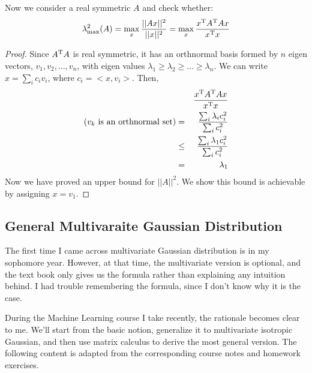 Now we consider a real symmetric $A$ and check whether:
\begin{equation}
	\lambda^2_{\max}(A) = \max_{x}{\frac{||Ax||^2}{||x||^2}}
	= \max_{x}{\frac{x^\mathrm{T}A^\mathrm{T}Ax}{x^\mathrm{T}x}}
\end{equation}

\begin{proof}
Since $A^\mathrm{T}A$ is real symmetric, it has an orthnormal basis 
formed by $n$ eigen vectors, $v_1, v_2, \dots, v_n$, with 
eigen values $\lambda_1 \ge \lambda_2 \ge \dots \ge \lambda_n$. We can 
write $x=\sum_{i}{c_iv_i}$, where $c_i=<x,v_i>$. Then, 
\begin{eqnarray}
	&&\frac{x^\mathrm{T}A^\mathrm{T}Ax}{x^\mathrm{T}x} \\
	\text{($v_k$ is an orthnormal set)}&=& \frac{\sum_i \lambda_i c_i^2}{\sum_{i}{c_i^2}} \\
	&\le & \frac{\sum_i \lambda_1 c_i^2}{\sum_{i}{c_i^2}} \\
	&=& \lambda_1
\end{eqnarray}
Now we have proved an upper bound for $||A||^2$. We show this bound is achievable 
by assigning $x=v_1$. 
\end{proof}
	
	
\subsection{General Multivaraite Gaussian Distribution}	

The first time I came across multivariate Gaussian distribution 
is in my sophomore year. However, at that time, the multivariate 
version is optional, and the text book only gives us the formula 
rather than explaining any intuition behind. I had trouble 
remembering the formula, since I don't know why it is the case.

During the Machine Learning course\cite{xu2012-mlt} I take recently, 
the rationale becomes clear to me. We'll start from the basic notion, 
generalize it to multivariate isotropic Gaussian, and then 
use matrix calculus to derive the most general version. 
The following content is adapted from the corresponding course notes
and homework exercises. 

